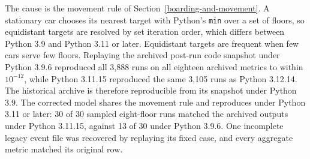 The cause is the movement rule of Section~\ref{boarding-and-movement}. A stationary car chooses its nearest target with Python's \texttt{min} over a set of floors, so equidistant targets are resolved by set iteration order, which differs between Python 3.9 and Python 3.11 or later. Equidistant targets are frequent when few cars serve few floors. Replaying the archived post-run code snapshot under Python 3.9.6 reproduced all 3,888 runs on all eighteen archived metrics to within $10^{-12}$, while Python 3.11.15 reproduced the same 3,105 runs as Python 3.12.14. The historical archive is therefore reproducible from its snapshot under Python 3.9. The corrected model shares the movement rule and reproduces under Python 3.11 or later: 30 of 30 sampled eight-floor runs matched the archived outputs under Python 3.11.15, against 13 of 30 under Python 3.9.6. One incomplete legacy event file was recovered by replaying its fixed case, and every aggregate metric matched its original row.

